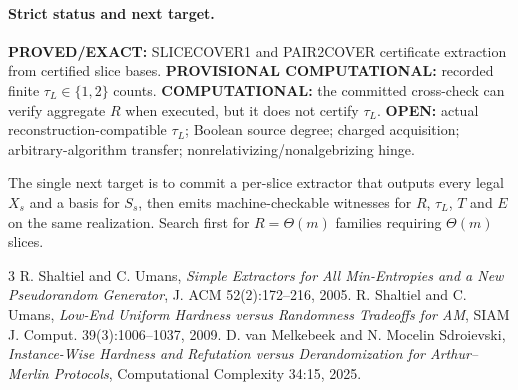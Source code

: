 \documentclass[11pt]{article}
\begin{document}
\paragraph{Strict status and next target.}
\textbf{PROVED/EXACT:} SLICECOVER1 and PAIR2COVER certificate extraction from certified slice bases.
\textbf{PROVISIONAL COMPUTATIONAL:} recorded finite $\tau_L\in\{1,2\}$ counts.
\textbf{COMPUTATIONAL:} the committed cross-check can verify aggregate $R$ when executed, but it does not certify $\tau_L$.
\textbf{OPEN:} actual reconstruction-compatible $\tau_L$; Boolean source degree; charged acquisition; arbitrary-algorithm transfer; nonrelativizing/nonalgebrizing hinge.

The single next target is to commit a per-slice extractor that outputs every legal $X_s$ and a basis for $S_s$, then emits machine-checkable witnesses for $R$, $\tau_L$, $T$ and $E$ on the same realization. Search first for $R=\Theta(m)$ families requiring $\Theta(m)$ slices.

\begin{thebibliography}{3}
 R. Shaltiel and C. Umans, \emph{Simple Extractors for All Min-Entropies and a New Pseudorandom Generator}, J. ACM 52(2):172--216, 2005.
 R. Shaltiel and C. Umans, \emph{Low-End Uniform Hardness versus Randomness Tradeoffs for AM}, SIAM J. Comput. 39(3):1006--1037, 2009.
 D. van Melkebeek and N. Mocelin Sdroievski, \emph{Instance-Wise Hardness and Refutation versus Derandomization for Arthur--Merlin Protocols}, Computational Complexity 34:15, 2025.
\end{thebibliography}
\end{document}
